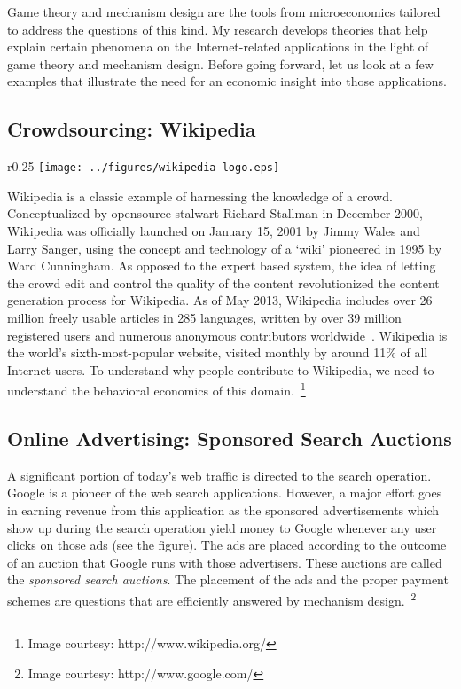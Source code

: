 \documentclass[10pt,psfig,letter]{article}
\begin{document}
Game theory and mechanism design are the tools from microeconomics tailored to address the questions of this kind. My research develops theories that help explain certain phenomena on the Internet-related applications in the light of game theory and mechanism design. Before going forward, let us look at a few examples that illustrate the need for an economic insight into those applications.

\subsection{Crowdsourcing: Wikipedia}

\begin{wrapfigure}{r}{0.25\columnwidth}
\centering
\vspace{-0.15in}
 \texttt{[image: ../figures/wikipedia-logo.eps]}
\vspace{-0.15in}
\end{wrapfigure}
Wikipedia is a classic example of harnessing the knowledge of a crowd. Conceptualized by opensource stalwart Richard Stallman in December 2000, Wikipedia was officially launched on January 15, 2001 by Jimmy Wales and Larry Sanger, using the concept and technology of a `wiki' pioneered in 1995 by Ward Cunningham. As opposed to the expert based system, the idea of letting the crowd edit and control the quality of the content revolutionized the content generation process for Wikipedia. 
As of May 2013, Wikipedia includes over 26 million freely usable articles in 285 languages, written by over 39 million registered users and numerous anonymous contributors worldwide~\cite{Wikimedia.org2013}. Wikipedia is the world's sixth-most-popular website, visited monthly by around 11\% of all Internet users. To understand why people contribute to Wikipedia, we need to understand the behavioral economics of this domain.~\footnote{Image courtesy: http://www.wikipedia.org/}
% 

\subsection{Online Advertising: Sponsored Search Auctions}


A significant portion of today's web traffic is directed to the search operation. Google is a pioneer of the web search applications. However, a major effort goes in earning revenue from this application as the sponsored advertisements which show up during the search operation yield money to Google whenever any user clicks on those ads (see the figure). The ads are placed according to the outcome of an auction that Google runs with those advertisers. These auctions are called the {\em sponsored search auctions}. The placement of the ads and the proper payment schemes are questions that are efficiently answered by mechanism design.~\footnote{Image courtesy: http://www.google.com/}
\end{document}
